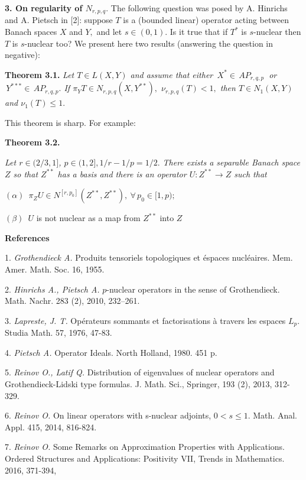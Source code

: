 {\bf 3. On regularity of $N_{r,p,q}.$}
The following question was posed by A. Hinrichs and A. Pietsch  in [2]:
suppose $T$ is a (bounded linear) operator acting between Banach spaces $X$ and $Y,$
and let $s\in(0,1).$ Is it true that if $T^*$ is $s$-nuclear then $T$ is $s$-nuclear too?
We present here two results (answering the question in negative):
\smallskip

\textbf{Theorem 3.1.} {\it
Let  $ T\in L(X,Y)$
and assume that either
$\, X^*\in \,AP_{r,q,p}\ $ or $\, Y^{***}\in \,AP_{r,q,p}.$
If $\pi_Y T\in N_{r,p,q}(X, Y^{**}),$
     $\nu_{r,p,q}(T)<1,$
then  $T\in N_1(X,Y)$ and
      $\nu_1(T)\le1.$
 }
\smallskip

This theorem is sharp. For example:

\smallskip

  \textbf{Theorem 3.2.} {\it
  Let $r\in(2/3,1]$, $p\in(1,2], 1/r-1/p=1/2.$
 There exists a separable Banach space $Z$ so that
   $Z^{**}$ has a ba\-sis and
 there is an operator $U:Z^{**}\to Z$ such that

  $(\alpha)$\, $\pi_ZU\in N^{[r,p_0]}(Z^{**},Z^{**}),\ \forall \, p_0\in[1,p);$

  $(\beta)$\, $U$ is not nuclear as a map from $Z^{**}$ into $Z$
}

  \smallskip
  \centerline{\bf References}\nopagebreak

1. {\it Grothendieck A.} Produits tensoriels topologiques et \'espa\-ces nucl\'eaires.
Mem. Amer. Math. Soc. 16, 1955.

2. {\it Hinrichs A.,  Pietsch A.} $p$-nuclear operators in the sense of Grothendieck.
Math. Nachr. 283 (2), 2010, 232--261.

3. {\it Lapreste, J. T.} Op\'erateurs sommants et factorisations \`a travers les espaces $L_p.$
Studia Math. 57, 1976, 47-83.

4. {\it Pietsch A.} Operator Ideals. North Holland, 1980. 451 p.

5. {\it Reinov O., Latif Q.} Distribution of eigenvalues of nuclear operators and
Grothendieck-Lidski type formulas. J. Math. Sci., Springer,
193 (2),  2013, 312-329.

6. {\it Reinov O.} On linear operators with s-nuclear adjoints, $0 < s \le 1.$
Math. Anal. Appl. 415, 2014, 816-824.

7. {\it Reinov O.} Some Remarks on Approximation Properties with Applications.
Ordered Structures and Applications: Positi\-vity VII, Trends in Mathematics. 2016, 371-394,
